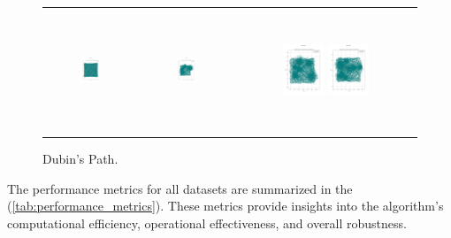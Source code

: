 \begin{figure}[p]
\begin{tabular}{ccc}
        \includegraphics[height=36mm,width=0.24\textwidth]{Images/simulation_no_obs/dubins_path/51.png}
        & \includegraphics[height=36mm,width=0.24\textwidth]{Images/simulation_no_obs/dubins_path/52.png}
        & \includegraphics[height=36mm,width=0.24\textwidth]{Images/simulation_no_obs/dubins_path/53.png}
        \includegraphics[height=36mm,width=0.24\textwidth]{Images/simulation_no_obs/dubins_path/54.png}\\[-4pt]

    \end{tabular}
    \caption{Dubin's Path.\label{fig:dubins_path}}
\end{figure}



\vspace*{6mm}

The performance metrics for all datasets are summarized in the (\autoref{tab:performance_metrics}). These metrics provide insights into the algorithm's computational efficiency, operational effectiveness, and overall robustness.


